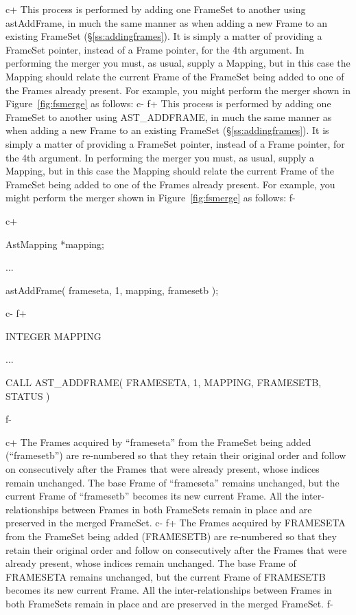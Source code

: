 \documentclass[twoside,11pt]{starlink}
\providecommand{\secref}[1]{\S\ref{#1}}
\begin{document}
{c+
This process is performed by adding one FrameSet to another using
astAddFrame, in much the same manner as when adding a new Frame to an
existing FrameSet (\secref{ss:addingframes}). It is simply a matter of
providing a FrameSet pointer, instead of a Frame pointer, for the 4th
argument. In performing the merger you must, as usual, supply a
Mapping, but in this case the Mapping should relate the current Frame
of the FrameSet being added to one of the Frames already present. For
example, you might perform the merger shown in
Figure~\ref{fig:fsmerge} as follows:
c-
f+
This process is performed by adding one FrameSet to another using
AST\_ADDFRAME, in much the same manner as when adding a new Frame to
an existing FrameSet (\secref{ss:addingframes}). It is simply a matter
of providing a FrameSet pointer, instead of a Frame pointer, for the
4th argument. In performing the merger you must, as usual, supply a
Mapping, but in this case the Mapping should relate the current Frame
of the FrameSet being added to one of the Frames already present. For
example, you might perform the merger shown in
Figure~\ref{fig:fsmerge} as follows:
f-

c+
\small
\begin{terminalv}
AstMapping *mapping;

...

astAddFrame( frameseta, 1, mapping, framesetb );
\end{terminalv}
\normalsize
c-
f+
\small
\begin{terminalv}
      INTEGER MAPPING

      ...

      CALL AST_ADDFRAME( FRAMESETA, 1, MAPPING, FRAMESETB, STATUS )
\end{terminalv}
\normalsize
f-

c+
The Frames acquired by ``frameseta'' from the FrameSet being added
(``framesetb'') are re-numbered so that they retain their original
order and follow on consecutively after the Frames that were already
present, whose indices remain unchanged. The base Frame of
``frameseta'' remains unchanged, but the current Frame of
``framesetb'' becomes its new current Frame. All the
inter-relationships between Frames in both FrameSets remain in place
and are preserved in the merged FrameSet.
c-
f+
The Frames acquired by FRAMESETA from the FrameSet being added
(FRAMESETB) are re-numbered so that they retain their original order
and follow on consecutively after the Frames that were already
present, whose indices remain unchanged. The base Frame of FRAMESETA
remains unchanged, but the current Frame of FRAMESETB becomes its new
current Frame. All the inter-relationships between Frames in both
FrameSets remain in place and are preserved in the merged FrameSet.
f-

}
\end{document}
